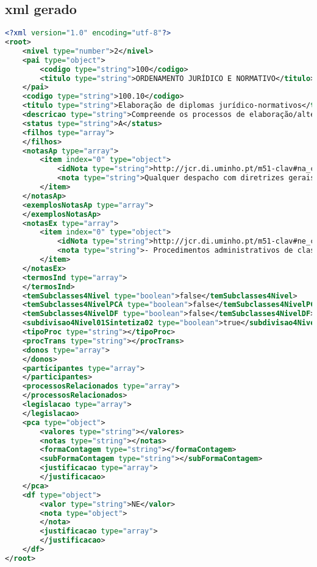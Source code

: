 \subsection{\acrshort{xml} gerado}
\begin{lstlisting}[language=xml, caption=\acrshort{xml} resultante da conversão do \acrshort{json} presente em~\ref{exem:json}]
<?xml version="1.0" encoding="utf-8"?>
<root>
    <nivel type="number">2</nivel>
    <pai type="object">
        <codigo type="string">100</codigo>
        <titulo type="string">ORDENAMENTO JURÍDICO E NORMATIVO</titulo>
    </pai>
    <codigo type="string">100.10</codigo>
    <titulo type="string">Elaboração de diplomas jurídico-normativos</titulo>
    <descricao type="string">Compreende os processos de elaboração/alteração de legislação, de regulamentos e de diretivas políticas ou operacionais portuguesas.</descricao>
    <status type="string">A</status>
    <filhos type="array">
    </filhos>
    <notasAp type="array">
        <item index="0" type="object">
            <idNota type="string">http://jcr.di.uminho.pt/m51-clav#na_c100.10_MRIKl-RBu_2sz5u9FzPqH</idNota>
            <nota type="string">Qualquer despacho com diretrizes gerais e abstratas</nota>
        </item>
    </notasAp>
    <exemplosNotasAp type="array">
    </exemplosNotasAp>
    <notasEx type="array">
        <item index="0" type="object">
            <idNota type="string">http://jcr.di.uminho.pt/m51-clav#ne_c100.10_bXM5qoj-hKZt6cijQktaj</idNota>
            <nota type="string">- Procedimentos administrativos de classificação do património cultural devem ser considerados em &quot;Reconhecimentos e permissões/ Classificação e declaração de interesse ou utilidade pública&quot; (450.20)</nota>
        </item>
    </notasEx>
    <termosInd type="array">
    </termosInd>
    <temSubclasses4Nivel type="boolean">false</temSubclasses4Nivel>
    <temSubclasses4NivelPCA type="boolean">false</temSubclasses4NivelPCA>
    <temSubclasses4NivelDF type="boolean">false</temSubclasses4NivelDF>
    <subdivisao4Nivel01Sintetiza02 type="boolean">true</subdivisao4Nivel01Sintetiza02>
    <tipoProc type="string"></tipoProc>
    <procTrans type="string"></procTrans>
    <donos type="array">
    </donos>
    <participantes type="array">
    </participantes>
    <processosRelacionados type="array">
    </processosRelacionados>
    <legislacao type="array">
    </legislacao>
    <pca type="object">
        <valores type="string"></valores>
        <notas type="string"></notas>
        <formaContagem type="string"></formaContagem>
        <subFormaContagem type="string"></subFormaContagem>
        <justificacao type="array">
        </justificacao>
    </pca>
    <df type="object">
        <valor type="string">NE</valor>
        <nota type="object">
        </nota>
        <justificacao type="array">
        </justificacao>
    </df>
</root>
\end{lstlisting}

